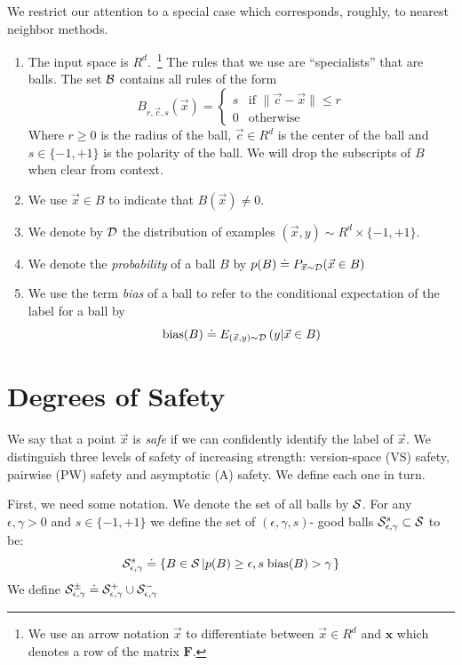 \documentclass{article}
\newcommand{\D}{{\cal D}}
\newcommand{\B}{{\cal B}}
\newcommand{\x}{\vec{x}}
\newcommand{\cc}{\vec{c}}
\renewcommand{\SS}{{\cal S}} %
\newcommand{\CC}{{\cal C}}  %
\newcommand{\vF}{\mathbf{F}}
\newcommand{\vx}{\mathbf{x}}
\newcommand{\bias}{\text{bias}}
\begin{document}
We restrict our attention to a special case which corresponds,
roughly, to nearest neighbor methods.
\begin{enumerate}
  \item The input space is $R^d$.~\footnote{We use an arrow notation $\x$ to
    differentiate between $\x \in R^d$ and $\vx$ which denotes a row
    of the matrix $\vF$.}
    The rules that we use are ``specialists'' that are balls. The set
    $\B$ contains all rules of the form 
    \[
    B_{r,\cc,s}(\x) =
    \begin{cases}
      s & \text{if } \| \cc- \x \| \leq r \\
    0 & \text{otherwise }
    \end{cases}
    \]
    Where $r \geq 0$ is the radius of the ball, $\cc \in R^d$ is the
    center of the ball and $s \in \{-1,+1\}$ is the polarity of the ball.
    We will drop the subscripts of $B$ when clear from context.
  \item
    We use $\x \in B$ to indicate that $B(\x) \neq 0$.
  \item
    We denote by $\D$ the distribution of examples $(\x,y) \sim R^d
    \times \{-1,+1\}$.
  \item
    We denote the {\em probability} of a ball $B$ by $p(B) \doteq
    P_{\x \sim \D}(\x \in B)$
  \item
    We use the term {\em bias} of a ball to refer to the conditional
    expectation of the label for a ball by
    $$
    \bias(B) \doteq E_{(\x,y)\sim\D}\left( y|\x \in B \right)
    $$
\end{enumerate}




\newcommand{\edge}{\gamma}
\newcommand{\SepsGamSig}{\SS_{\epsilon,\edge}^{s}}
\newcommand{\SepsGam}{\SS_{\epsilon,\edge}}
\newcommand{\SepsGamMinusSig}{\SS_{\epsilon,\edge}^{-s}}
\newcommand{\ConstrepsGamSig}{\CC_{\epsilon,\edge}^{s}}
\newcommand{\ConstrepsGam}{\CC_{\epsilon,\edge}}
\newcommand{\ConstrepsGamMinusSig}{\CC_{\epsilon,\edge}^{-s}}

\section{Degrees of Safety}
We say that a point $\x$ is {\em safe} if we can confidently identify
the label of $\x$. We distinguish three levels of safety of
increasing strength: version-space (VS) safety, pairwise (PW) safety and
asymptotic (A) safety. We define each one in turn.

First, we need some notation. We denote the set of all balls by $\SS$. For any $\epsilon,\edge>0$
and $s \in \{-1,+1\}$ we define the set of $(\epsilon,\edge,s)$-
good balls $\SepsGamSig \subset \SS$ to be:
\[
\SepsGamSig \doteq \left\{B \in \SS \left| p(B) \geq \epsilon,
s\; \bias(B) > \edge \right. \right\}
\]
We define $\SepsGam^{\pm} \doteq \SepsGam^{+} \cup \SepsGam^{-}$
\end{document}
